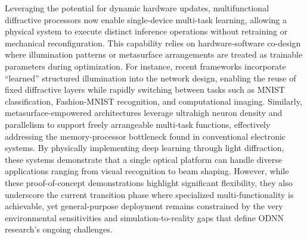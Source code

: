 \documentclass[11pt]{article}
\begin{document}
Leveraging the potential for dynamic hardware updates, multifunctional diffractive processors now enable single-device multi-task learning, allowing a physical system to execute distinct inference operations without retraining or mechanical reconfiguration. This capability relies on hardware-software co-design where illumination patterns or metasurface arrangements are treated as trainable parameters during optimization. For instance, recent frameworks incorporate ``learned'' structured illumination into the network design, enabling the reuse of fixed diffractive layers while rapidly switching between tasks such as MNIST classification, Fashion-MNIST recognition, and computational imaging. Similarly, metasurface-empowered architectures leverage ultrahigh neuron density and parallelism to support freely arrangeable multi-task functions, effectively addressing the memory-processor bottleneck found in conventional electronic systems. By physically implementing deep learning through light diffraction, these systems demonstrate that a single optical platform can handle diverse applications ranging from visual recognition to beam shaping. However, while these proof-of-concept demonstrations highlight significant flexibility, they also underscore the current transition phase where specialized multi-functionality is achievable, yet general-purpose deployment remains constrained by the very environmental sensitivities and simulation-to-reality gaps that define ODNN research's ongoing challenges. \citep{doi_10_1364_ol_591818_8738c4b1} \citep{doi_10_1364_prj_576203_ae347fba}
\end{document}
